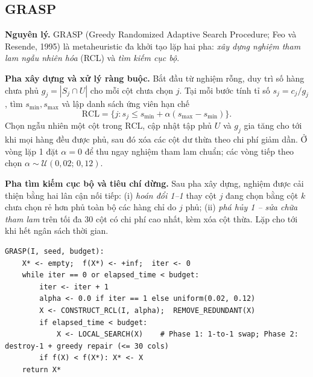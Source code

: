 \documentclass[a4paper,12pt]{article}
\begin{document}
\subsection{GRASP}
\textbf{Nguyên lý.} GRASP (Greedy Randomized Adaptive Search Procedure; Feo và Resende, 1995) là metaheuristic đa khởi tạo lặp hai pha: \emph{xây dựng nghiệm tham lam ngẫu nhiên hóa} (RCL) và \emph{tìm kiếm cục bộ}.

\textbf{Pha xây dựng và xử lý ràng buộc.} Bắt đầu từ nghiệm rỗng, duy trì số hàng chưa phủ $g_j = |S_j \cap U|$ cho mỗi cột chưa chọn $j$. Tại mỗi bước tính tỉ số $s_j = c_j / g_j$, tìm $s_{\min}, s_{\max}$ và lập danh sách ứng viên hạn chế
\[
\mathrm{RCL} = \{j : s_j \le s_{\min} + \alpha (s_{\max} - s_{\min})\}.
\]
Chọn ngẫu nhiên một cột trong $\mathrm{RCL}$, cập nhật tập phủ $U$ và $g_j$ gia tăng cho tới khi mọi hàng đều được phủ, sau đó xóa các cột dư thừa theo chi phí giảm dần. Ở vòng lặp 1 đặt $\alpha = 0$ để thu ngay nghiệm tham lam chuẩn; các vòng tiếp theo chọn $\alpha \sim \mathcal{U}(0{,}02;\, 0{,}12)$.

\textbf{Pha tìm kiếm cục bộ và tiêu chí dừng.} Sau pha xây dựng, nghiệm được cải thiện bằng hai lân cận nối tiếp: (i) \emph{hoán đổi 1--1} thay cột $j$ đang chọn bằng cột $k$ chưa chọn rẻ hơn phủ toàn bộ các hàng chỉ do $j$ phủ; (ii) \emph{phá hủy 1 -- sửa chữa tham lam} trên tối đa 30 cột có chi phí cao nhất, kèm xóa cột thừa. Lặp cho tới khi hết ngân sách thời gian.

\begin{Verbatim}
GRASP(I, seed, budget):
    X* <- empty;  f(X*) <- +inf;  iter <- 0
    while iter == 0 or elapsed_time < budget:
        iter <- iter + 1
        alpha <- 0.0 if iter == 1 else uniform(0.02, 0.12)
        X <- CONSTRUCT_RCL(I, alpha);  REMOVE_REDUNDANT(X)
        if elapsed_time < budget:
            X <- LOCAL_SEARCH(X)    # Phase 1: 1-to-1 swap; Phase 2: destroy-1 + greedy repair (<= 30 cols)
        if f(X) < f(X*): X* <- X
    return X*
\end{Verbatim}
\end{document}
